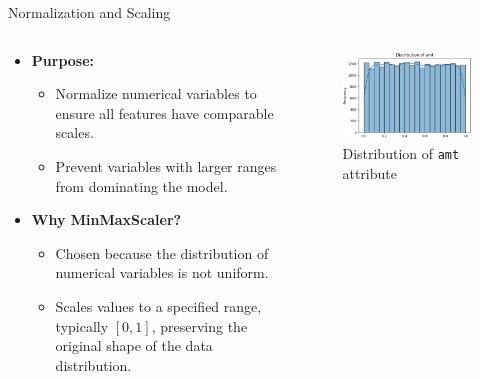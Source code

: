 \documentclass{beamer}
\begin{document}
\begin{frame}{Normalization and Scaling}
    \begin{columns} %
    \begin{column}{0.6\textwidth}
    \begin{itemize}
        \item \textbf{Purpose:}
        \begin{itemize}
            \item Normalize numerical variables to ensure all features have comparable scales.
            \item Prevent variables with larger ranges from dominating the model.
        \end{itemize}
        \item \textbf{Why MinMaxScaler?}
        \begin{itemize}
            \item Chosen because the distribution of numerical variables is not uniform.
            \item Scales values to a specified range, typically \([0, 1]\), preserving the original shape of the data distribution.
        \end{itemize}
    \end{itemize}
    \end{column}

    \begin{column}{0.4\textwidth}
    \begin{figure}
        \centering
        \includegraphics[width=1\textwidth]{images/norm.png} %
        \caption{Distribution of \texttt{amt} attribute}
    \end{figure}
\end{column}
\end{columns}
\end{frame}
\end{document}
